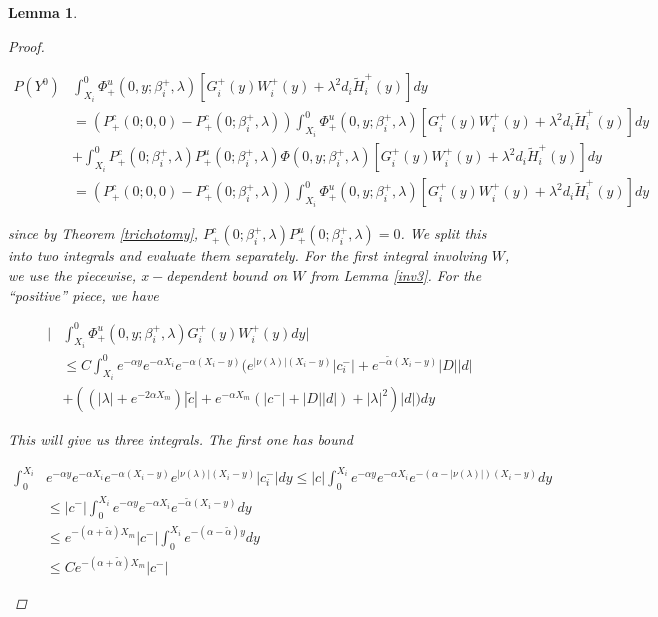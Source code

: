 \documentclass[12pt]{article}
\newtheorem{lemma}{Lemma}
\begin{document}
\begin{lemma}
\begin{proof}
\begin{enumerate}
\begin{align*}
P(Y^0) &\int_{X_i}^0 \Phi^u_+(0, y; \beta_i^+, \lambda) [ G_i^+(y)W_i^+(y) + \lambda^2 d_i \tilde{H}_i^+(y) ] dy \\
&= ( P^c_+(0; 0, 0) - P^c_+(0; \beta_i^+, \lambda)) \int_{X_i}^0 \Phi^u_+(0, y; \beta_i^+, \lambda) [ G_i^+(y)W_i^+(y) + \lambda^2 d_i \tilde{H}_i^+(y) ] dy \\
&+ \int_{X_i}^0 P^c_+(0; \beta_i^+, \lambda) P^u_+(0; \beta_i^+, \lambda) \Phi(0, y; \beta_i^+, \lambda) [ G_i^+(y)W_i^+(y) + \lambda^2 d_i \tilde{H}_i^+(y) ] dy \\
&= ( P^c_+(0; 0, 0) - P^c_+(0; \beta_i^+, \lambda)) \int_{X_i}^0 \Phi^u_+(0, y; \beta_i^+, \lambda) [ G_i^+(y)W_i^+(y) + \lambda^2 d_i \tilde{H}_i^+(y) ] dy
\end{align*}

since by Theorem \ref{trichotomy}, $P^c_+(0; \beta_i^+, \lambda) P^u_+(0; \beta_i^+, \lambda) = 0$. We split this into two integrals and evaluate them separately. For the first integral involving $W$, we use the piecewise, $x-$dependent bound on $W$ from Lemma \ref{inv3}. For the ``positive'' piece, we have

\begin{align*}
\Big| &\int_{X_i}^0 \Phi^u_+(0, y; \beta_i^+, \lambda) G_i^+(y)W_i^+(y) dy \Big| \\
&\leq C \int_{X_i}^0 e^{-\alpha y} e^{-\alpha X_i} e^{-\alpha (X_i - y)} ( e^{|\nu(\lambda)|(X_i - y)} |c_i^-| + e^{-\tilde{\alpha}(X_i - y)}|D||d| \\
&+ ( (|\lambda| + e^{-2 \alpha X_m}) |\tilde{c}| + e^{-\alpha X_m}( |c^-| + |D||d| ) + |\lambda|^2) |d|) dy
\end{align*}

This will give us three integrals. The first one has bound

\begin{align*}
\int_0^{X_i} &e^{-\alpha y} e^{-\alpha X_i} e^{-\alpha (X_i - y)} e^{|\nu(\lambda)|(X_i - y)} |c_i^-| dy \leq |c| \int_0^{X_i} e^{-\alpha y} e^{-\alpha X_i} e^{-(\alpha - |\nu(\lambda)|) (X_i - y)} dy \\ 
&\leq |c^-| \int_0^{X_i} e^{-\alpha y} e^{-\alpha X_i} e^{-\tilde{\alpha}(X_i - y)} dy \\
&\leq e^{-(\alpha + \tilde{\alpha}) X_m} |c^-| \int_0^{X_i} e^{-(\alpha - \tilde{\alpha}) y} dy \\
&\leq C e^{-(\alpha + \tilde{\alpha}) X_m} |c^-|
\end{align*}


\end{enumerate}
\end{proof}
\end{lemma}
\end{document}
